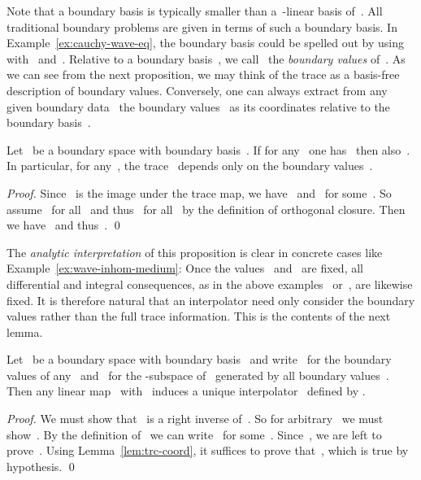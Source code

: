 \documentclass[a4paper]{llncs}
\newenvironment{myproof}{\begin{proof}}{\qed\end{proof}}
\begin{document}
Note that a boundary basis is typically smaller than a~-linear
basis of~. All traditional boundary problems are given in terms
of such a boundary basis. In Example~\ref{ex:cauchy-wave-eq}, the
boundary basis could be spelled out by using~
with~ and~. Relative to a boundary basis~, we
call~ the \emph{boundary values}
of~. As we can see from the next proposition, we
may think of the trace as a basis-free description of boundary
values. Conversely, one can always extract from any given boundary
data~ the boundary values~ as its
coordinates relative to the boundary basis~.

\begin{mylemma}
  \label{lem:trc-coord}
  Let~ be a boundary space with boundary
  basis~. If for any~
  one has~ then
  also~. In particular, for any~,
  the trace~ depends only on the boundary values~.
\end{mylemma}
\begin{myproof}
  Since~ is the image under the trace map, we have~
  and~ for some~. So
  assume~ for all~ and
  thus~ for all~ by the definition of
  orthogonal closure. Then we have~ and thus~.
\end{myproof}

The \emph{analytic interpretation} of this proposition is clear in
concrete cases like Example~\ref{ex:wave-inhom-medium}: Once the
values~ and~ are fixed, all
differential and integral consequences, as in the above
examples~ or~,
are likewise fixed. It is therefore natural that an interpolator need
only consider the boundary values rather than the full trace
information. This is the contents of the next lemma.

\begin{mylemma}
  \label{lem:int-coord}
  Let~ be a boundary space with boundary
  basis~ and write~ for the boundary values of any~
  and~ for the -subspace of~ generated by all
  boundary values~. Then any linear map~ with~ induces a unique
  interpolator~ defined by
  .
\end{mylemma}
\begin{myproof}
  We must show that~ is a right inverse
  of~. So for arbitrary~ we must
  show~. By the definition of~ we can
  write~ for some~. Since~, we
  are left to prove~. Using Lemma~\ref{lem:trc-coord}, it
  suffices to prove that~, which is true by hypothesis.
\end{myproof}
\end{document}
